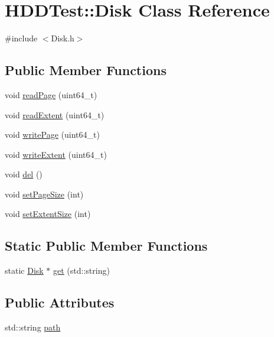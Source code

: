 \hypertarget{class_h_d_d_test_1_1_disk}{\section{H\-D\-D\-Test\-:\-:Disk Class Reference}
\label{class_h_d_d_test_1_1_disk}
}


{\ttfamily \#include $<$Disk.\-h$>$}

\subsection*{Public Member Functions}
\begin{DoxyCompactItemize}
\item 
void \hyperlink{class_h_d_d_test_1_1_disk_a5afff4786de776408acd86e3a91206c7}{read\-Page} (uint64\-\_\-t)
\item 
void \hyperlink{class_h_d_d_test_1_1_disk_adb3541b1531a7029e5d688f123df9baf}{read\-Extent} (uint64\-\_\-t)
\item 
void \hyperlink{class_h_d_d_test_1_1_disk_a538c61b9ff956231d7f05d19419eada1}{write\-Page} (uint64\-\_\-t)
\item 
void \hyperlink{class_h_d_d_test_1_1_disk_a4954ba9185b24bb98828934cb116b8dd}{write\-Extent} (uint64\-\_\-t)
\item 
void \hyperlink{class_h_d_d_test_1_1_disk_a08131fbb8f001b5f8b60056308f5a8da}{del} ()
\item 
void \hyperlink{class_h_d_d_test_1_1_disk_a161bd5f5921eb78bdd7a51757267e61b}{set\-Page\-Size} (int)
\item 
void \hyperlink{class_h_d_d_test_1_1_disk_a78e515afa9536ed390d317c1f595fe9e}{set\-Extent\-Size} (int)
\end{DoxyCompactItemize}
\subsection*{Static Public Member Functions}
\begin{DoxyCompactItemize}
\item 
static \hyperlink{class_h_d_d_test_1_1_disk}{Disk} $\ast$ \hyperlink{class_h_d_d_test_1_1_disk_a0f6006970c964527bb5a2e6e0cb16b87}{get} (std\-::string)
\end{DoxyCompactItemize}
\subsection*{Public Attributes}
\begin{DoxyCompactItemize}
\item 
std\-::string \hyperlink{class_h_d_d_test_1_1_disk_ac8e5dd8530a2f2913a8d1f25013549a4}{path}
\end{DoxyCompactItemize}
